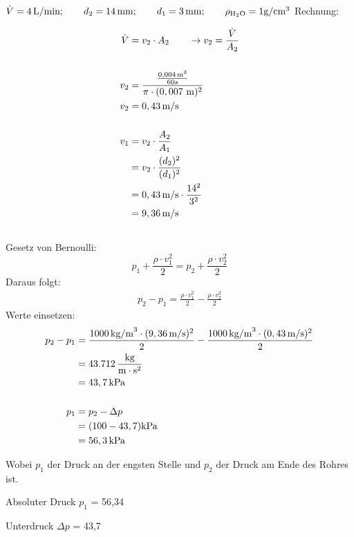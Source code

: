 \documentclass[a4paper,11pt]{article}
\begin{document}
$\dot{V}=4 \mskip3mu \text{L/min} ; \qquad d_2 = 14 \mskip3mu \text{mm} ; \qquad d_1 = 3\mskip3mu \text{mm} ; \qquad \rho_{\text{H$_2$O}} = 1\text{g}/\text{cm}^3$ 
\pp
Rechnung:

\begin{align*}
\dot{V} &= v_2 \cdot A_2 \qquad \rightarrow v_2 = \frac{\dot{V}}{A_2} \\ \\
v_2 &= \frac{\frac{0,004 \mskip3mu \text{m}^3}{60s}}{\pi \cdot (0,007~\text{m})^2} \\ 
v_2 &= 0,43\mskip3mu \text{m}/\text{s}\\ \\
v_1 &= v_2 \cdot \frac{A_2}{A_1}\\
&= v_2 \cdot \frac{(d_2)^2}{(d_1)^2} \\
&= 0,43\mskip3mu \text{m/s} \cdot \frac{14^2}{3^2} \\
&=9,36\mskip3mu \text{m/s} \\ \\
\end{align*}
Gesetz von Bernoulli:
\begin{equation}
p_1 + \frac{\rho \cdot v_1^2}{2} = p_2 + \frac{\rho \cdot v_2^2}{2}
\end{equation}
Daraus folgt:
\begin{align*}
p_2 - p_1 = \frac{\rho \cdot v_1^2}{2} -  \frac{\rho \cdot v_2^2}{2} 
\end{align*}
Werte einsetzen: 
\begin{align*}
p_2 - p_1 &= \frac{1000 \mskip3mu \text{kg/m}^3 \cdot (9,36\mskip3mu \text{m/s} )^2}{2} -  \frac{1000 \mskip3mu \text{kg/m}^3 \cdot (0,43 \mskip3mu \text{m/s} )^2}{2} \\
&= 43.712 \mskip3mu \frac{\text{kg}}{\text{m} \cdot \text{s}^2} \\
&= 43,7 \mskip3mu \text{kPa} \\ \\
p_1 &= p_2 - \Delta p \\
	&= (100 - 43,7)\text{kPa}\\ &= 56,3\mskip3mu \text{kPa}
\end{align*}
\pp

Wobei $p_1$ der Druck an der engsten Stelle und $p_2$ der Druck am Ende des Rohres ist.\par
Absoluter Druck $p_1$ = 56,34  \par 
Unterdruck $\Delta p$ = 43,7  \par 
\end{document}
